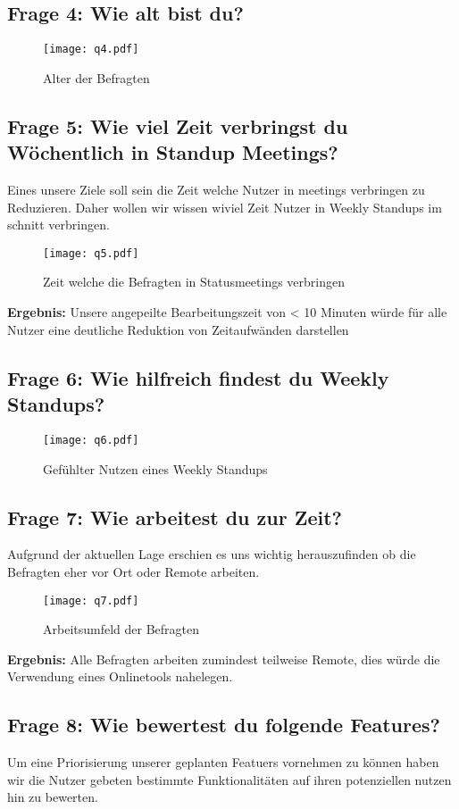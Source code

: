 \subsection{Frage 4: Wie alt bist du?} 
\begin{figure}[H]
	\centering
	\texttt{[image: q4.pdf]}
    \caption{Alter der Befragten}
	\label{fig:q4}
\end{figure}     
\subsection{Frage 5: Wie viel Zeit verbringst du Wöchentlich in Standup Meetings?}
Eines unsere Ziele soll sein die Zeit welche Nutzer in meetings verbringen zu Reduzieren. Daher wollen wir wissen wiviel Zeit Nutzer in Weekly Standups im schnitt verbringen.
\begin{figure}[H]
	\centering
	\texttt{[image: q5.pdf]}
    \caption{Zeit welche die Befragten in Statusmeetings verbringen}
	\label{fig:q5}
\end{figure}
\textbf{Ergebnis:} Unsere angepeilte Bearbeitungszeit von < 10 Minuten würde für alle Nutzer eine deutliche Reduktion von Zeitaufwänden darstellen
\subsection{Frage 6: Wie hilfreich findest du Weekly Standups?}

\begin{figure}[H]
	\centering
	\texttt{[image: q6.pdf]}
    \caption{Gefühlter Nutzen eines Weekly Standups}
	\label{fig:q6}
\end{figure}  
\subsection{Frage 7: Wie arbeitest du zur Zeit?}
Aufgrund der aktuellen Lage erschien es uns wichtig herauszufinden ob die Befragten eher vor Ort oder Remote arbeiten.
\begin{figure}[H]
	\centering
	\texttt{[image: q7.pdf]}
    \caption{Arbeitsumfeld der Befragten}
	\label{fig:q7}
\end{figure}  
\textbf{Ergebnis:} Alle Befragten arbeiten zumindest teilweise Remote, dies würde die Verwendung eines Onlinetools nahelegen.
\subsection{Frage 8: Wie bewertest du folgende Features?}
Um eine Priorisierung unserer geplanten Featuers vornehmen zu können haben wir die Nutzer gebeten bestimmte Funktionalitäten auf ihren potenziellen nutzen hin zu bewerten. 
